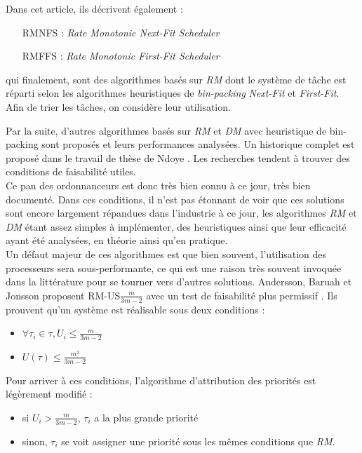 \documentclass[11pt,a4paper,oneside]{report}
\begin{document}
Dans cet article, ils décrivent également :\\
\begin{itemize}
	\item[RMNFS] : \textit{Rate Monotonic Next-Fit Scheduler}
	\item[RMFFS] : \textit{Rate Monotonic First-Fit Scheduler}
\end{itemize}
\vspace{1em}
qui finalement, sont des algorithmes basés sur \textit{RM} dont le système de tâche est 
réparti selon les algorithmes heuristiques de \textit{bin-packing} \textit{Next-Fit} et \textit{First-Fit}. 
Afin de trier les tâches, on considère leur utilisation.


Par la suite, d'autres algorithmes basés sur \textit{RM} et \textit{DM} avec 
heuristique de bin-packing sont proposés et leurs performances analysées. 
Un historique complet est proposé dans le travail de thèse de Ndoye \cite{ndoye_ordonnancement_2014}. 
Les recherches tendent à trouver des conditions de faisabilité utiles.\\

Ce pan des ordonnanceurs est donc très bien connu à ce jour, très bien documenté. 
Dans ces conditions, il n'est pas étonnant de voir que ces solutions sont encore largement 
répandues dans l'industrie à ce jour, les algorithmes \textit{RM} et \textit{DM} 
étant assez simples à implémenter, des heuristiques ainsi que leur efficacité ayant été analysées, en théorie ainsi qu'en pratique.\\

Un défaut majeur de ces algorithmes est que bien souvent, l'utilisation des processeurs sera 
sous-performante, ce qui est une raison très souvent invoquée dans la littérature pour se 
tourner vers d'autres solutions. 
Andersson, Baruah et Jonsson proposent RM-US$\frac{m}{3m-2}$ avec un test 
de faisabilité plus permissif \cite{andersson_static-priority_2001}. Ils prouvent 
qu'un système est réalisable sous deux conditions :\\
\begin{itemize}
	\item $\forall \tau_i \in \tau, U_i \leq \frac{m}{3m-2}$
	\item $U(\tau) \leq \frac{m^2}{3m-2}$ 
\end{itemize}
\vspace{1em}
Pour arriver à ces conditions, l'algorithme d'attribution des priorités est légèrement modifié : \\
\begin{itemize}
	\item si $U_i > \frac{m}{3m-2}$, $\tau_i$ a la plus grande priorité
	\item sinon, $\tau_i$ se voit assigner une priorité sous les mêmes conditions que \textit{RM}.
\end{itemize}
\end{document}
